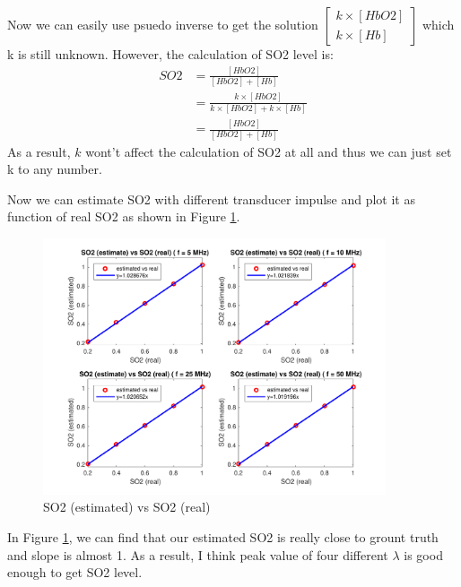 \documentclass{article}
\begin{document}
Now we can easily use psuedo inverse to get the solution 
$
    \begin{bmatrix}
        k \times [HbO2] \\
        k \times [Hb]
    \end{bmatrix}
$
which k is still unknown. However, the calculation of SO2 level is:
\begin{align*}
    SO2 & = \frac{[HbO2]}{[HbO2] + [Hb]} \\
        & = \frac{k \times [HbO2]}{k \times [HbO2] + k \times [Hb]} \\
        & = \frac{[HbO2]}{[HbO2] + [Hb]}
\end{align*}
As a result, $k$ wont't affect the calculation of SO2 at all and thus we can just set k to any number.

Now we can estimate SO2 with different transducer impulse and plot it as function of real SO2 as shown in 
Figure \ref{fig:p2a}.
\begin{figure}[H]
    \centering
    \includegraphics[width=0.9\textwidth]{src/p2a.pdf}
    \caption{SO2 (estimated) vs SO2 (real)}
    \label{fig:p2a}
\end{figure}
In Figure \ref{fig:p2a}, we can find that our estimated SO2 is really close to grount truth and slope is almost 1. As a result,
I think peak value of four different $\lambda$ is good enough to get SO2 level.
\end{document}
